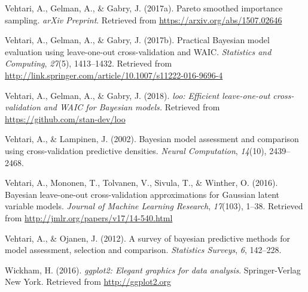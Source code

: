 \documentclass[english,,doc,floatsintext]{apa6}
\theoremstyle{definition}
\theoremstyle{definition}
\theoremstyle{definition}
\theoremstyle{remark}
\begin{document}
\leavevmode\hypertarget{ref-vehtari2017psis}{}%
Vehtari, A., Gelman, A., \& Gabry, J. (2017a). Pareto smoothed
importance sampling. \emph{arXiv Preprint}. Retrieved from
\url{https://arxiv.org/abs/1507.02646}

\leavevmode\hypertarget{ref-vehtari2017loo}{}%
Vehtari, A., Gelman, A., \& Gabry, J. (2017b). Practical Bayesian model
evaluation using leave-one-out cross-validation and WAIC.
\emph{Statistics and Computing}, \emph{27}(5), 1413--1432. Retrieved
from \url{http://link.springer.com/article/10.1007/s11222-016-9696-4}

\leavevmode\hypertarget{ref-loo2018}{}%
Vehtari, A., Gelman, A., \& Gabry, J. (2018). \emph{loo: Efficient
leave-one-out cross-validation and WAIC for Bayesian models.} Retrieved
from \url{https://github.com/stan-dev/loo}

\leavevmode\hypertarget{ref-vehtari2002}{}%
Vehtari, A., \& Lampinen, J. (2002). Bayesian model assessment and
comparison using cross-validation predictive densities. \emph{Neural
Computation}, \emph{14}(10), 2439--2468.

\leavevmode\hypertarget{ref-vehtari2016}{}%
Vehtari, A., Mononen, T., Tolvanen, V., Sivula, T., \& Winther, O.
(2016). Bayesian leave-one-out cross-validation approximations for
Gaussian latent variable models. \emph{Journal of Machine Learning
Research}, \emph{17}(103), 1--38. Retrieved from
\url{http://jmlr.org/papers/v17/14-540.html}

\leavevmode\hypertarget{ref-vehtari2012}{}%
Vehtari, A., \& Ojanen, J. (2012). A survey of bayesian predictive
methods for model assessment, selection and comparison. \emph{Statistics
Surveys}, \emph{6}, 142--228.

\leavevmode\hypertarget{ref-ggplot2}{}%
Wickham, H. (2016). \emph{ggplot2: Elegant graphics for data analysis}.
Springer-Verlag New York. Retrieved from \url{http://ggplot2.org}
\end{document}
